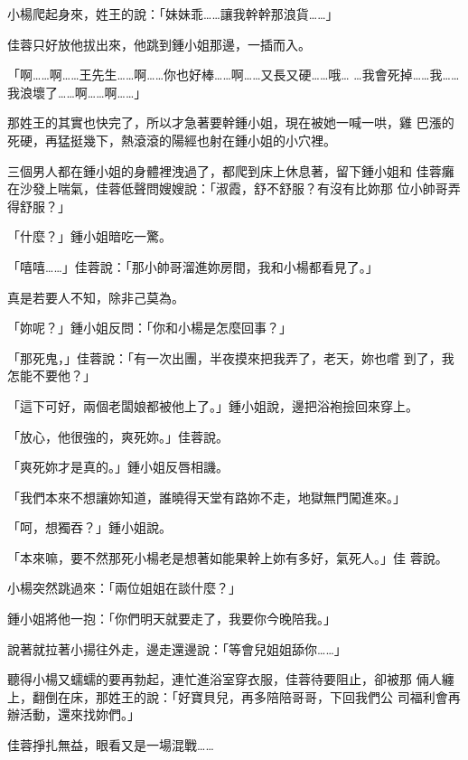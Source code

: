 小楊爬起身來，姓王的說：「妹妹乖……讓我幹幹那浪貨……」

佳蓉只好放他拔出來，他跳到鍾小姐那邊，一插而入。

「啊……啊……王先生……啊……你也好棒……啊……又長又硬……哦…
…我會死掉……我……我浪壞了……啊……啊……」

那姓王的其實也快完了，所以才急著要幹鍾小姐，現在被她一喊一哄，雞
巴漲的死硬，再猛挺幾下，熱滾滾的陽經也射在鍾小姐的小穴裡。

三個男人都在鍾小姐的身體裡洩過了，都爬到床上休息著，留下鍾小姐和
佳蓉癱在沙發上喘氣，佳蓉低聲問嫂嫂說：「淑霞，舒不舒服？有沒有比妳那
位小帥哥弄得舒服？」

「什麼？」鍾小姐暗吃一驚。

「嘻嘻……」佳蓉說：「那小帥哥溜進妳房間，我和小楊都看見了。」

真是若要人不知，除非己莫為。

「妳呢？」鍾小姐反問：「你和小楊是怎麼回事？」

「那死鬼，」佳蓉說：「有一次出團，半夜摸來把我弄了，老天，妳也嚐
到了，我怎能不要他？」

「這下可好，兩個老闆娘都被他上了。」鍾小姐說，邊把浴袍撿回來穿上。

「放心，他很強的，爽死妳。」佳蓉說。

「爽死妳才是真的。」鍾小姐反唇相譏。

「我們本來不想讓妳知道，誰曉得天堂有路妳不走，地獄無門闖進來。」

「呵，想獨吞？」鍾小姐說。

「本來嘛，要不然那死小楊老是想著如能果幹上妳有多好，氣死人。」佳
蓉說。

小楊突然跳過來：「兩位姐姐在談什麼？」

鍾小姐將他一抱：「你們明天就要走了，我要你今晚陪我。」

說著就拉著小揚往外走，邊走還邊說：「等會兒姐姐舔你……」

聽得小楊又蠕蠕的要再勃起，連忙進浴室穿衣服，佳蓉待要阻止，卻被那
倆人纏上，翻倒在床，那姓王的說：「好寶貝兒，再多陪陪哥哥，下回我們公
司福利會再辦活動，還來找妳們。」

佳蓉掙扎無益，眼看又是一場混戰……










